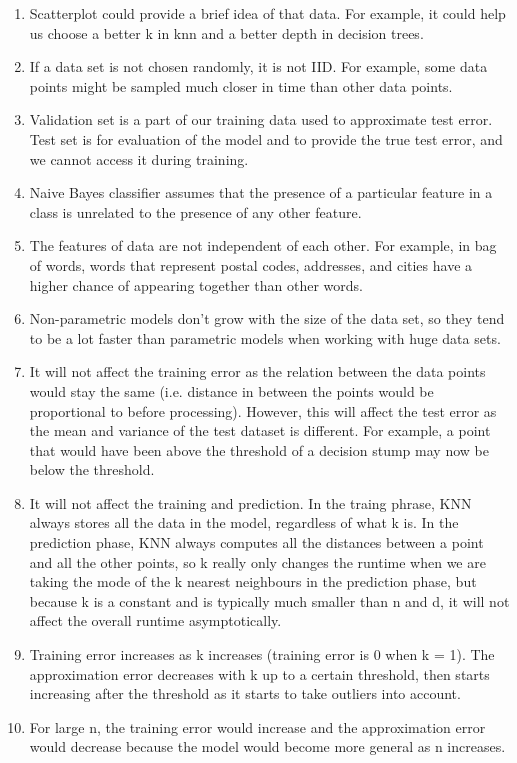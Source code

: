 \documentclass{article}
\begin{document}
\begin{enumerate}
\item  Scatterplot could provide a brief idea of that data. For example, it could help us choose a better k in knn and a better depth in decision trees.
\item  If a data set is not chosen randomly, it is not IID. For example, some data points might be sampled much closer in time than other data points.
\item Validation set is a part of our training data used to approximate test error. Test set is for evaluation of the model and to provide the true test error, and we cannot access it during training.
\item Naive Bayes classifier assumes that the presence of a particular feature in a class is unrelated to the presence of any other feature.
\item The features of data are not independent of each other. For example, in bag of words, words that represent postal codes, addresses, and cities have a higher chance of appearing together than other words.
\item Non-parametric models don't grow with the size of the data set, so they tend to be a lot faster than parametric models when working with huge data sets.
\item It will not affect the training error as the relation between the data points would stay the same (i.e. distance in between the points would be proportional to before processing). However, this will affect the test error as the mean and variance of the test dataset is different. For example, a point that would have been above the threshold of a decision stump may now be below the threshold.
\item It will not affect the training and prediction. In the traing phrase, KNN always stores all the data in the model, regardless of what k is. In the prediction phase, KNN always computes all the distances between a point and all the other points, so k really only changes the runtime when we are taking the mode of the k nearest neighbours in the prediction phase, but because k is a constant and is typically much smaller than n and d, it will not affect the overall runtime asymptotically.
\item Training error increases as k increases (training error is 0 when k = 1). The approximation error decreases with k up to a certain threshold, then starts increasing after the threshold as it starts to take outliers into account.
\item For large n, the training error would increase and the approximation error would decrease because the model would become more general as n increases.
\end{enumerate}
\end{document}
